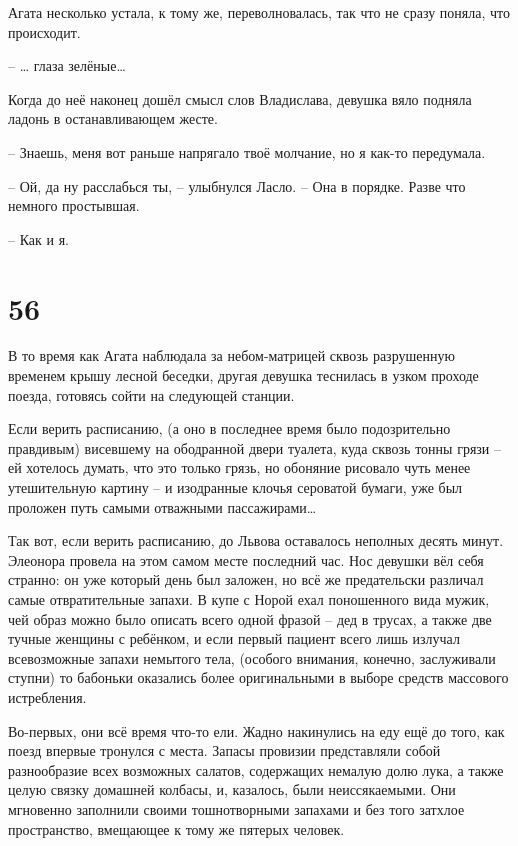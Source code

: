 \documentclass[
  a5paperpaper,
  DIV=11,
  numbers=noendperiod]{scrreprt}
\begin{document}
Агата несколько устала, к тому же, переволновалась, так что не сразу
поняла, что происходит.

-- \ldots{} глаза зелёные\ldots{}

Когда до неё наконец дошёл смысл слов Владислава, девушка вяло подняла
ладонь в останавливающем жесте.

-- Знаешь, меня вот раньше напрягало твоё молчание, но я как-то
передумала.

-- Ой, да ну расслабься ты, -- улыбнулся Ласло. -- Она в порядке. Разве
что немного простывшая.

-- Как и я.

\section*{56}\label{56}


В то время как Агата наблюдала за небом-матрицей сквозь разрушенную
временем крышу лесной беседки, другая девушка теснилась в узком проходе
поезда, готовясь сойти на следующей станции.

Если верить расписанию, (а оно в последнее время было подозрительно
правдивым) висевшему на ободранной двери туалета, куда сквозь тонны
грязи -- ей хотелось думать, что это только грязь, но обоняние рисовало
чуть менее утешительную картину -- и изодранные клочья сероватой бумаги,
уже был проложен путь самыми отважными пассажирами\ldots{}

Так вот, если верить расписанию, до Львова оставалось неполных десять
минут. Элеонора провела на этом самом месте последний час. Нос девушки
вёл себя странно: он уже который день был заложен, но всё же
предательски различал самые отвратительные запахи. В купе с Норой ехал
поношенного вида мужик, чей образ можно было описать всего одной фразой
-- дед в трусах, а также две тучные женщины с ребёнком, и если первый
пациент всего лишь излучал всевозможные запахи немытого тела, (особого
внимания, конечно, заслуживали ступни) то бабоньки оказались более
оригинальными в выборе средств массового истребления.

Во-первых, они всё время что-то ели. Жадно накинулись на еду ещё до
того, как поезд впервые тронулся с места. Запасы провизии представляли
собой разнообразие всех возможных салатов, содержащих немалую долю лука,
а также целую связку домашней колбасы, и, казалось, были неиссякаемыми.
Они мгновенно заполнили своими тошнотворными запахами и без того затхлое
пространство, вмещающее к тому же пятерых человек.
\end{document}
